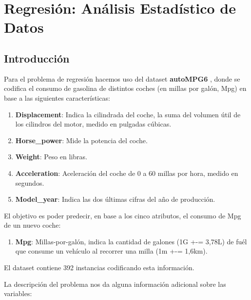 \section{Regresión: Análisis Estadístico de Datos}

\subsection{Introducción}

Para el problema de regresión hacemos uso del dataset \textbf{autoMPG6} \cite{autompg}, donde se codifica el consumo de gasolina de distintos coches (en millas por galón, Mpg) en base a las siguientes características:

\begin{enumerate}
\def\labelenumi{\arabic{enumi}.}
    \item \textbf{Displacement}: Indica la cilindrada del coche, la suma del volumen útil de los cilindros del motor, medido en pulgadas cúbicas.
    \item \textbf{Horse\_power}: Mide la potencia del coche.
    \item \textbf{Weight}: Peso en libras.
    \item \textbf{Acceleration}: Aceleración del coche de 0 a 60 millas por hora, medido
    en segundos.
    \item \textbf{Model\_year}: Indica las dos últimas cifras del año de producción.
\end{enumerate}

El objetivo es poder predecir, en base a los cinco atributos, el consumo de Mpg de un nuevo coche:

\begin{enumerate}
    \def\labelenumi{\arabic{enumi}.}
    \setcounter{enumi}{5}
    \item \textbf{Mpg}: Millas-por-galón, indica la cantidad de galones (1G +-= 3,78L) de fuél que consume un vehículo al recorrer una milla (1m +-= 1,6km).
\end{enumerate}

El dataset contiene 392 instancias codificando esta información.

\vspace{\baselineskip}

La descripción del problema nos da alguna información adicional sobre las variables:

